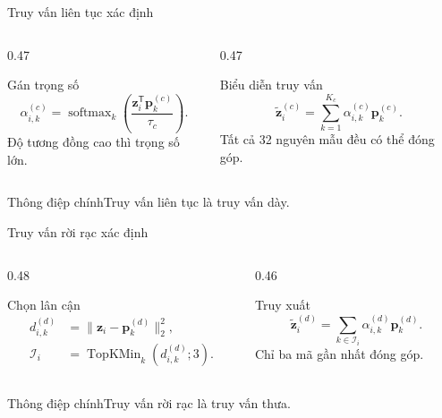 \documentclass[aspectratio=169]{beamer}
\newcommand{\takeaway}[1]{\begin{alertblock}{Thông điệp chính}#1\end{alertblock}}
\begin{document}
\begin{frame}{Truy vấn liên tục xác định}
  \begin{columns}[T,onlytextwidth]
    \begin{column}{0.47\textwidth}\begin{block}{Gán trọng số}\[\alpha^{(c)}_{i,k}=\operatorname{softmax}_k\left(\frac{\mathbf z_i^\mathsf T\mathbf p_k^{(c)}}{\tau_c}\right).\]\small Độ tương đồng cao thì trọng số lớn.\end{block}\end{column}
    \begin{column}{0.47\textwidth}\begin{exampleblock}{Biểu diễn truy vấn}\[\widetilde{\mathbf z}^{(c)}_i=\sum_{k=1}^{K_c}\alpha^{(c)}_{i,k}\mathbf p_k^{(c)}.\]\small Tất cả 32 nguyên mẫu đều có thể đóng góp.\end{exampleblock}\end{column}
  \end{columns}
  \takeaway{Truy vấn liên tục là truy vấn dày.}
\end{frame}

\begin{frame}{Truy vấn rời rạc xác định}
  \begin{columns}[T,onlytextwidth]
    \begin{column}{0.48\textwidth}\begin{block}{Chọn lân cận}\[\begin{aligned} d^{(d)}_{i,k}&=\lVert\mathbf z_i-\mathbf p_k^{(d)}\rVert_2^2,\\ \mathcal I_i&=\operatorname{TopKMin}_k(d^{(d)}_{i,k};3). \end{aligned}\]\end{block}\end{column}
    \begin{column}{0.46\textwidth}\begin{exampleblock}{Truy xuất}\[\widetilde{\mathbf z}^{(d)}_i=\sum_{k\in\mathcal I_i}\alpha^{(d)}_{i,k}\mathbf p_k^{(d)}.\]\small Chỉ ba mã gần nhất đóng góp.\end{exampleblock}\end{column}
  \end{columns}
  \takeaway{Truy vấn rời rạc là truy vấn thưa.}
\end{frame}
\end{document}
